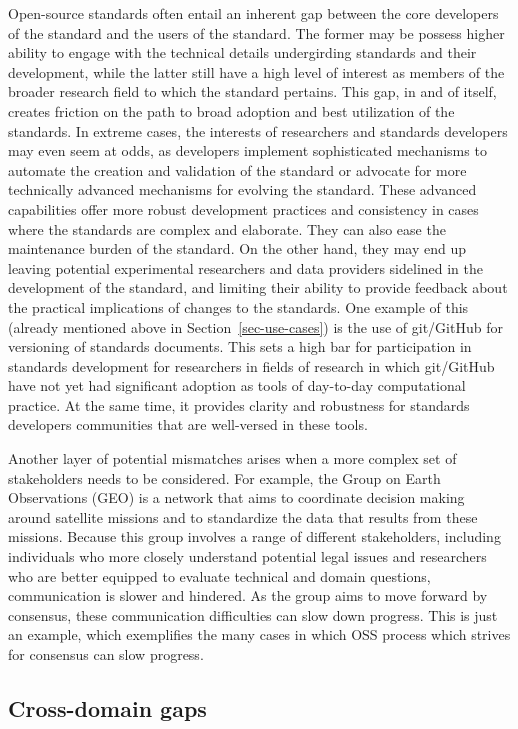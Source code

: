 \documentclass[
  letterpaper,
  DIV=11,
  numbers=noendperiod]{scrartcl}
\begin{document}
Open-source standards often entail an inherent gap between the core
developers of the standard and the users of the standard. The former may
be possess higher ability to engage with the technical details
undergirding standards and their development, while the latter still
have a high level of interest as members of the broader research field
to which the standard pertains. This gap, in and of itself, creates
friction on the path to broad adoption and best utilization of the
standards. In extreme cases, the interests of researchers and standards
developers may even seem at odds, as developers implement sophisticated
mechanisms to automate the creation and validation of the standard or
advocate for more technically advanced mechanisms for evolving the
standard. These advanced capabilities offer more robust development
practices and consistency in cases where the standards are complex and
elaborate. They can also ease the maintenance burden of the standard. On
the other hand, they may end up leaving potential experimental
researchers and data providers sidelined in the development of the
standard, and limiting their ability to provide feedback about the
practical implications of changes to the standards. One example of this
(already mentioned above in Section~\ref{sec-use-cases}) is the use of
git/GitHub for versioning of standards documents. This sets a high bar
for participation in standards development for researchers in fields of
research in which git/GitHub have not yet had significant adoption as
tools of day-to-day computational practice. At the same time, it
provides clarity and robustness for standards developers communities
that are well-versed in these tools.

Another layer of potential mismatches arises when a more complex set of
stakeholders needs to be considered. For example, the Group on Earth
Observations (GEO) is a network that aims to coordinate decision making
around satellite missions and to standardize the data that results from
these missions. Because this group involves a range of different
stakeholders, including individuals who more closely understand
potential legal issues and researchers who are better equipped to
evaluate technical and domain questions, communication is slower and
hindered. As the group aims to move forward by consensus, these
communication difficulties can slow down progress. This is just an
example, which exemplifies the many cases in which OSS process which
strives for consensus can slow progress.

\subsection{Cross-domain gaps}\label{cross-domain-gaps}
\end{document}
